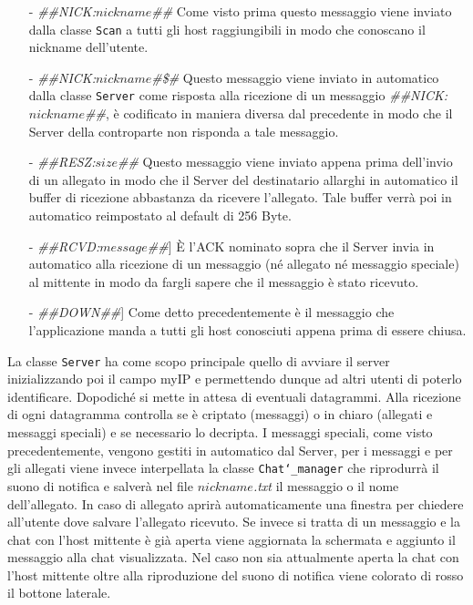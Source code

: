 \begin{itemize}
	\item[-] \emph{\#\#NICK:$nickname$\#\#} Come visto prima questo messaggio viene inviato dalla classe
	\texttt{Scan} a tutti gli host raggiungibili in modo che conoscano il nickname dell'utente.
	\item[-] \emph{\#\#NICK:$nickname$\#\$\#} Questo messaggio viene inviato in automatico dalla classe 
	\texttt{Server} come risposta alla ricezione di un messaggio \emph{\#\#NICK:$nickname$\#\#}, è codificato
	in maniera diversa dal 	precedente in modo che il Server della controparte non risponda a tale messaggio.
	\item[-] \emph{\#\#RESZ:$size$\#\#} Questo messaggio viene inviato appena prima dell'invio di un allegato in 
	modo che il Server del destinatario allarghi in automatico il buffer di ricezione abbastanza da ricevere 
	l'allegato. Tale buffer verrà poi in automatico reimpostato al default di 256 Byte.
	\item[-] \emph{\#\#RCVD:$message$\#\#}] È l'ACK nominato sopra che il Server invia in automatico alla ricezione 	
	di un messaggio (né allegato né messaggio speciale) al mittente in modo da fargli sapere che il messaggio è 
	stato ricevuto.
	\item[-] \emph{\#\#DOWN\#\#}] Come detto precedentemente è il messaggio che l'applicazione manda a tutti gli 
	host conosciuti appena prima di essere chiusa.
\end{itemize}

La classe \texttt{Server} ha come scopo principale quello di avviare il server
inizializzando poi il campo myIP e permettendo dunque ad altri utenti di poterlo identificare.
Dopodiché si mette in attesa di eventuali datagrammi. Alla ricezione di ogni datagramma controlla se
è criptato (messaggi) o in chiaro (allegati e messaggi speciali) e se necessario lo decripta. 
I messaggi speciali, come visto precedentemente, vengono gestiti in automatico dal Server, per i
messaggi e per gli allegati viene invece interpellata la classe \texttt{Chat\char`_manager} che riprodurrà
il suono di notifica e salverà nel file \emph{$nickname$.txt} il messaggio o il nome dell'allegato. In caso di 
allegato aprirà automaticamente una finestra per chiedere all'utente dove salvare l'allegato ricevuto.
Se invece si tratta di un messaggio e la chat con l'host mittente è già aperta viene aggiornata la schermata e 
aggiunto il messaggio alla chat visualizzata. Nel caso non sia attualmente aperta la chat con l'host
mittente oltre alla riproduzione del suono di notifica viene colorato di rosso il bottone laterale.